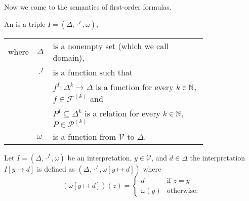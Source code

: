 Now we come to the semantics of first-order formulas.
\begin{definition}\label{def.2.21}
	An  is a triple $I=(\Delta,\cdot^I,\omega)$,
	\begin{tabular}{llp{0.78\linewidth}}
		where & $\Delta$  & is a nonempty set (which we call  domain),                                                     \\
& $\cdot^I$ & is a function such that                                                                        \\
&           & $f^I\colon\Delta^k\to\Delta$  is a function for every $k\in\mathbb{N}$, $f\in\mathcal{F}^{(k)}$ and \\
&           & $P^I\subseteq\Delta^k$ is a relation for every $k\in\mathbb{N}$, $P\in\mathcal{P}^{(k)}$       \\
& $\omega$  & is a function from $\mathcal{V}$ to $\Delta$.                                                  
	\end{tabular}
\end{definition}
Let $I=(\Delta,\cdot^I,\omega)$ be an interpretation, $y\in\mathcal{V}$, and $d\in\Delta$ the interpretation $I\left[y\mapsto d\right]$ is defined as $(\Delta,\cdot^I,\omega\left[y\mapsto d\right])$ where
\[(\omega\left[y\mapsto d\right])(z)=
	\begin{cases}
		d         & \text{if $z=y$}   \\
		\omega(y) & \text{otherwise.} 
	\end{cases}\]
